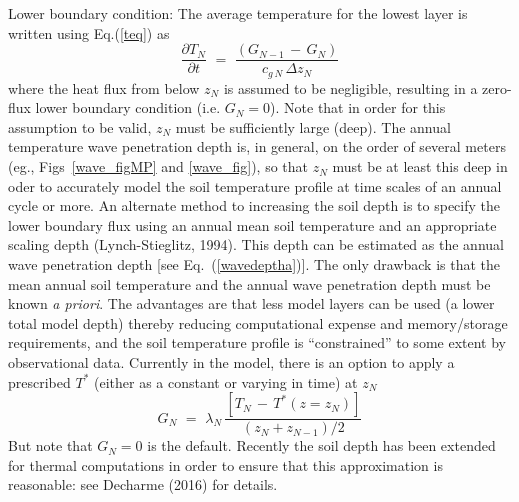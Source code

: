 Lower boundary condition:
%
The average temperature for the lowest layer is 
written using Eq.(\ref{teq}) as
%
%
\begin{equation}
\label{teqn}
\frac{\partial T_{N}}{\partial t} \,\,=\,\,
\frac{( G_{N-1} \,-\, G_N )}{c_{g\,N}\,\Delta z_N}
\end{equation}
%
where the heat flux from below $z_N$ is
assumed to be negligible, resulting in a
zero-flux lower boundary condition (i.e. $G_N = 0$).
Note that in order for this assumption to be valid,
$z_N$ must be sufficiently large (deep). 
The annual temperature wave penetration
depth is, in general, on the order of several meters
(eg., Figs~\ref{wave_figMP} and \ref{wave_fig}), so that
$z_N$ must be at least this deep in oder to accurately model the 
soil temperature profile at time scales of an annual
cycle or more.
%
An alternate method to increasing the soil depth
is to specify the lower boundary flux using an annual
mean soil temperature and an appropriate scaling depth
(Lynch-Stieglitz, 1994\nocite{Lynch-Stieglitz1994}). 
This depth can be estimated as the annual wave penetration depth
[see Eq.~(\ref{wavedeptha})]. The only drawback 
is that the mean annual soil temperature
and the annual wave penetration depth 
must be known {\it a priori}. The advantages are that less model
layers can be used (a lower total model depth) thereby
reducing computational expense and memory/storage requirements,
and the soil temperature profile is ``constrained'' to some extent
by observational data. 
%
Currently in the model, there is an
option to apply a prescribed $T^\ast$ (either as
a constant or varying in time)
at $z_N$ 
%
%
\begin{equation}
\label{lowerbcflxn}
G_N \,\,=\,\,\lambda_N \,
\frac{\left[T_N\,-\,T^\ast\left( z=z_N\right)\right]}
{\left(z_N+z_{N-1}\right)/2}
\end{equation}
%
But note that $G_N=0$ is the default. Recently the soil depth has
been extended for thermal computations in order to ensure that this
approximation is reasonable: see Decharme \etal (2016) for details.


